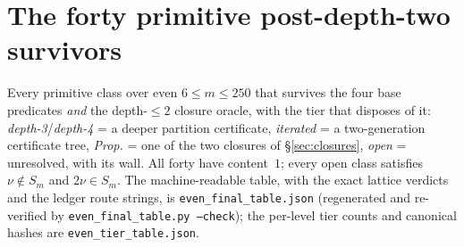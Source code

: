 \documentclass[11pt]{amsart}
\theoremstyle{remark}
\begin{document}
\appendix

\section{The forty primitive post-depth-two survivors}\label{app:table}

Every primitive class over even $6\le m\le250$ that survives the four base predicates \emph{and}
the depth-$\le2$ closure oracle, with the tier that disposes of it: \emph{depth-3}/\emph{depth-4}
= a deeper partition certificate, \emph{iterated} = a two-generation certificate tree,
\emph{Prop.} = one of the two closures of \S\ref{sec:closures}, \emph{open} = unresolved, with
its wall. All forty have content~$1$; every open class satisfies $\nu\notin S_m$ and
$2\nu\in S_m$. The machine-readable table, with the exact lattice verdicts and the ledger route
strings, is \texttt{even\_final\_table.json} (regenerated and re-verified by
\texttt{even\_final\_table.py --check}); the per-level tier counts and canonical hashes are
\texttt{even\_tier\_table.json}.
\end{document}
